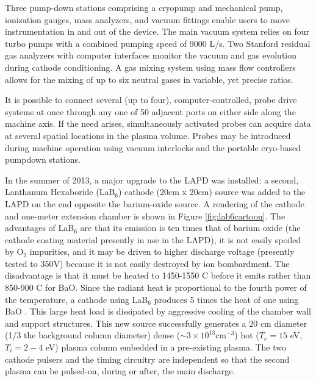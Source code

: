 \documentclass[11pt]{article}
\begin{document}
Three pump-down stations comprising a cryopump and mechanical pump, ionization gauges, mass analyzers, and vacuum fittings enable users to move instrumentation in and out of the device.  The main vacuum system relies on four turbo pumps with a combined pumping speed of 9000 L/s.  Two Stanford residual gas analyzers with computer interfaces monitor the vacuum and gas evolution during cathode conditioning.   A gas mixing system using mass flow controllers allows for the mixing of up to six neutral gases in variable, yet precise ratios.

		It is possible to connect several (up to four), computer-controlled, probe drive systems at once through any one of 50 adjacent ports on either side along the machine axis.  If the need arises, simultaneously activated probes can acquire data at several spatial locations in the plasma volume.  Probes may be introduced during machine operation using vacuum interlocks and the portable cryo-based pumpdown stations. 
		
		
		In the summer of 2013, a major upgrade to the LAPD was installed: a second, Lanthanum Hexaboride (LaB$_{6}$) cathode (20cm x 20cm)  source was added to the LAPD on the end opposite the barium-oxide source. A rendering of the cathode and one-meter extension chamber is shown in Figure \ref{fig:lab6cartoon}. The advantages of LaB$_{6}$ are that its emission is ten times that of barium oxide (the cathode coating material presently in use in the LAPD), it is not easily spoiled by O$_{2}$ impurities, and it may be driven to higher discharge voltage (presently tested to 350V) because it is not easily destroyed by ion bombardment.  The disadvantage is that it must be heated to 1450-1550 C before it emits rather than 850-900 C for BaO.  Since the radiant heat is proportional to the fourth power of the temperature, a cathode using LaB$_{6}$ produces 5 times the heat of one using BaO .  This large heat load is dissipated by aggressive cooling of the chamber wall and support structures.   This new source successfully generates a 20 cm diameter (1/3 the background column diameter) dense ($\sim 3\times 10^{13}$cm$^{-3}$) hot ($T_{e}=15$ eV, $T_{i}=2-4$ eV) plasma column embedded in a pre-existing plasma.  The two cathode pulsers and the timing circuitry are independent so that the second plasma can be pulsed-on, during or after, the main discharge.
\end{document}
